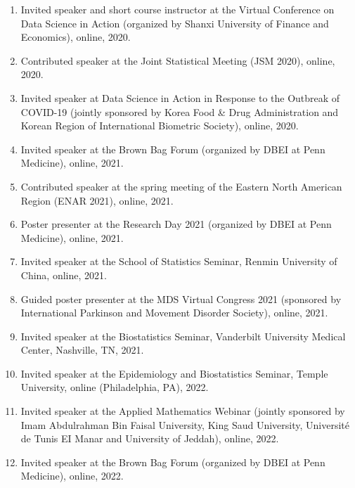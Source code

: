 \documentclass[12pt]{article}
\begin{document}
\begin{enumerate}
		\item Invited speaker and short course instructor at the Virtual Conference on Data Science in Action (organized by Shanxi 	University of Finance and Economics), online, 2020.
		
		\item Contributed speaker at the Joint Statistical Meeting (JSM 2020), online, 2020.
		
		\item Invited speaker at Data Science in Action in Response to the Outbreak of COVID-19 (jointly sponsored by Korea Food \& Drug Administration and	Korean Region of International Biometric Society), online, 2020.
		
		\item Invited speaker at the Brown Bag Forum (organized by DBEI at Penn Medicine), online, 2021.
		
		\item Contributed speaker at the spring meeting of the Eastern North American Region (ENAR 2021), online, 2021.
		
		\item Poster presenter at the Research Day 2021 (organized by DBEI at Penn Medicine), online, 2021.
		
		\item Invited speaker at the School of Statistics Seminar, 
		Renmin University of China, online, 2021.
		
		\item Guided poster presenter at the MDS Virtual Congress 
		2021 (sponsored by International Parkinson and Movement 
		Disorder Society), online, 2021.
		
		\item Invited speaker at the Biostatistics Seminar, 
		Vanderbilt University Medical Center, Nashville, TN, 2021.
		
		\item Invited speaker at the Epidemiology and Biostatistics 
		Seminar, Temple University, online (Philadelphia, PA), 2022.
		
		\item Invited speaker at the Applied Mathematics Webinar 
		(jointly sponsored by Imam Abdulrahman Bin Faisal University, King Saud University, Universit\'{e} de Tunis EI Manar and University of Jeddah), online, 2022.
		
		\item Invited speaker at the Brown Bag Forum (organized by DBEI at Penn Medicine), online, 2022.
		

\end{enumerate}
\end{document}
